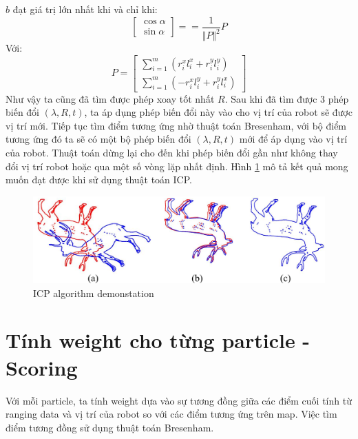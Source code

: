 \documentclass[../../main.tex]{subfiles}
\begin{document}
$b$ đạt giá trị lớn nhất khi và chỉ khi:
\begin{equation}
    \begin{bmatrix}
        \cos{\alpha} \\ \sin{\alpha}
    \end{bmatrix}
    == \frac{1}{\Vert P \Vert^2}P
\end{equation}
Với:
\begin{equation}
    P = 
    \begin{bmatrix}
        \sum_{i = 1}^{m} (r^x_i l^x_i + r^y_i l^y_i) \\
        \sum_{i = 1}^{m} (-r^x_i l^y_i + r^y_i l^x_i)
    \end{bmatrix}
\end{equation}
Như vậy ta cũng đã tìm được phép xoay tốt nhất $R$.
Sau khi đã tìm được 3 phép biến đổi $(\lambda, R, t)$, ta áp dụng phép biến đổi này vào cho vị trí của robot sẽ được vị trí mới. Tiếp tục tìm điểm tương ứng nhờ thuật toán Bresenham, với bộ điểm tương ứng đó ta sẽ có một bộ phép biến đổi $(\lambda, R, t)$ mới để áp dụng vào vị trí của robot. Thuật toán dừng lại cho đến khi phép biến đổi gần như không thay đổi vị trí robot hoặc qua một số vòng lặp nhất định. Hình \ref{fig:icp} mô tả kết quả mong muốn đạt được khi sử dụng thuật toán ICP.

\begin{figure}[H]
    \begin{center}
        \includegraphics[scale=0.6]{icp.png}
    \end{center}
    \caption{ICP algorithm demonstation}
    \label{fig:icp}
\end{figure}

\section{Tính weight cho từng particle - Scoring}
Với mỗi particle, ta tính weight dựa vào sự tương đồng giữa các điểm cuối tính từ ranging data và vị trí của robot so với các điểm tương ứng trên map. Việc tìm điểm tương đồng sử dụng thuật toán Bresenham.
\end{document}
